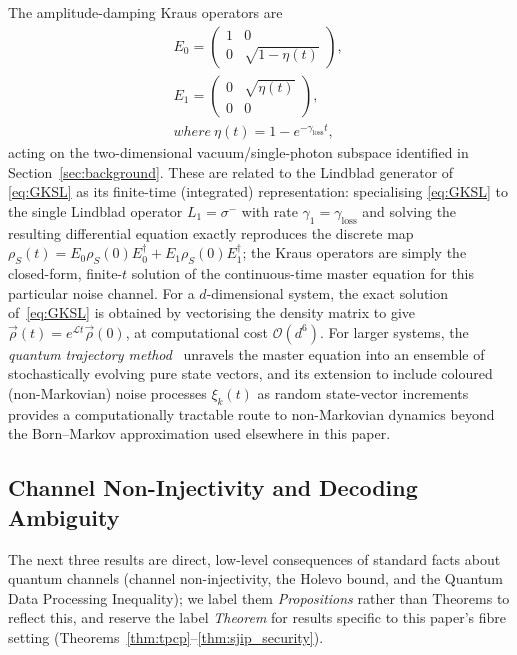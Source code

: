 \documentclass[journal,twocolumn]{IEEEtran}
\theoremstyle{definition}
\theoremstyle{plain}
\begin{document}
The amplitude-damping Kraus operators are
\begin{align}
  &E_0 = \begin{pmatrix}1 & 0 \\ 0 & \sqrt{1-\eta(t)}\end{pmatrix},
  \quad
  \\&E_1 = \begin{pmatrix}0 & \sqrt{\eta(t)} \\ 0 & 0\end{pmatrix},
  \label{eq:kraus}
  \\&where \
  \eta(t) = 1 - e^{-\gamma_{\mathrm{loss}} t}, \nonumber
\end{align}
acting on the two-dimensional vacuum/single-photon subspace
identified in Section~\ref{sec:background}. These are related to the
Lindblad generator of \eqref{eq:GKSL} as its finite-time
(integrated) representation: specialising \eqref{eq:GKSL} to the
single Lindblad operator $L_1=\sigma^-$ with rate
$\gamma_1=\gamma_{\mathrm{loss}}$ and solving the resulting
differential equation exactly reproduces the discrete map
$\rho_S(t) = E_0\rho_S(0)E_0^\dagger + E_1\rho_S(0)E_1^\dagger$; the
Kraus operators are simply the closed-form, finite-$t$ solution of
the continuous-time master equation for this particular noise
channel.  For a $d$-dimensional
system, the exact solution of~\eqref{eq:GKSL} is obtained by
vectorising the density matrix to give $\vec\rho(t) =
e^{\mathcal{L}t}\vec\rho(0)$, at computational cost
$\mathcal{O}(d^6)$.  For larger systems, the \emph{quantum
trajectory method}~\cite{dalibard1992,carmichael1993} unravels the
master equation into an ensemble of stochastically evolving pure
state vectors, and its extension to include coloured (non-Markovian)
noise processes $\xi_k(t)$ as random state-vector increments
provides a computationally tractable route to non-Markovian dynamics
beyond the Born--Markov approximation used elsewhere in this paper.

\subsection{Channel Non-Injectivity and Decoding Ambiguity}

The next three results are direct, low-level consequences of
standard facts about quantum channels (channel non-injectivity, the
Holevo bound, and the Quantum Data Processing Inequality); we label
them \emph{Propositions} rather than Theorems to reflect this, and
reserve the label \emph{Theorem} for results specific to this
paper's fibre setting (Theorems~\ref{thm:tpcp}--\ref{thm:sjip_security}).
\end{document}
